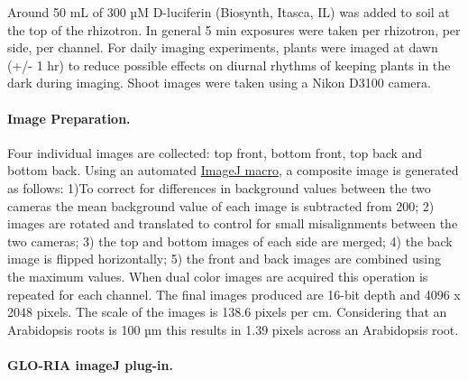 \documentclass[]{article}
\begin{document}
Around 50 mL of 300 µM D-luciferin (Biosynth, Itasca, IL) was added to
soil at the top of the rhizotron. In general 5 min exposures were taken
per rhizotron, per side, per channel. For daily imaging experiments,
plants were imaged at dawn (+/- 1 hr) to reduce possible effects on
diurnal rhythms of keeping plants in the dark during imaging. Shoot
images were taken using a Nikon D3100 camera.

\paragraph{Image Preparation.}\label{image-preparation.}

Four individual images are collected: top front, bottom front, top back
and bottom back. Using an automated
\href{https://github.com/rr-lab/GLO-Roots/blob/master/gloria/gloroot_combine.ijm}{ImageJ
macro}, a composite image is generated as follows: 1)To correct for
differences in background values between the two cameras the mean
background value of each image is subtracted from 200; 2) images are
rotated and translated to control for small misalignments between the
two cameras; 3) the top and bottom images of each side are merged; 4)
the back image is flipped horizontally; 5) the front and back images are
combined using the maximum values. When dual color images are acquired
this operation is repeated for each channel. The final images produced
are 16-bit depth and 4096 x 2048 pixels. The scale of the images is
138.6 pixels per cm. Considering that an Arabidopsis roots is 100 µm
this results in 1.39 pixels across an Arabidopsis root.

\paragraph{GLO-RIA imageJ plug-in.}\label{glo-ria-imagej-plug-in.}
\end{document}
